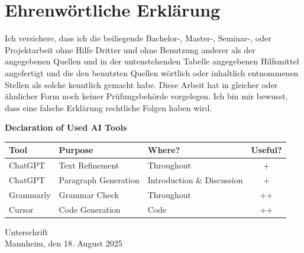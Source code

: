 \documentclass[a4paper,oneside,bibliography=totoc]{scrbook}
\begin{document}
\backmatter
\chapter{Ehrenwörtliche Erklärung}
\label{ch:declaration}

Ich versichere, dass ich die beiliegende Bachelor-, Master-, Seminar-, oder
Projektarbeit ohne Hilfe Dritter und ohne Benutzung anderer als der angegebenen
Quellen und in der untenstehenden Tabelle angegebenen Hilfsmittel angefertigt
und die den benutzten Quellen wörtlich oder inhaltlich entnommenen Stellen als
solche kenntlich gemacht habe. Diese Arbeit hat in gleicher oder ähnlicher Form
noch keiner Prüfungsbehörde vorgelegen. Ich bin mir bewusst, dass eine falsche
Erklärung rechtliche Folgen haben wird.

\begin{center}
  \textbf{Declaration of Used AI Tools} \\[.3em]
  \begin{tabularx}{\textwidth}{lXlc}
    \toprule
    Tool      & Purpose              & Where?                     & Useful? \\
    \midrule
    ChatGPT   & Text Refinement      & Throughout                 & +       \\
    ChatGPT   & Paragraph Generation & Introduction \& Discussion & +       \\
    Grammarly & Grammar Check        & Throughout                 & ++      \\
    Cursor    & Code Generation      & Code                       & ++      \\
    \bottomrule
  \end{tabularx}
\end{center}

\vspace{2cm}
\noindent Unterschrift\\
\noindent Mannheim, den 18. August 2025 \hfill
\end{document}
